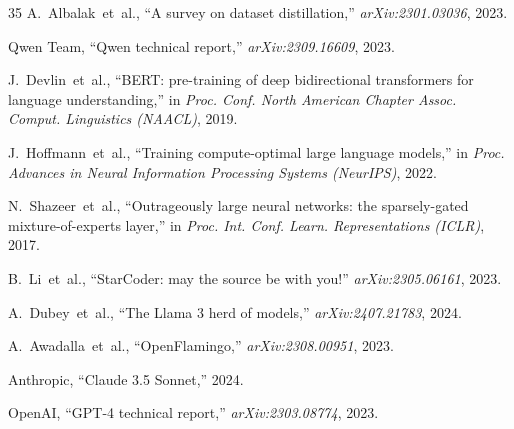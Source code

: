\documentclass[journal]{IEEEtran}
\begin{document}
\begin{thebibliography}{35}
A.~Albalak~et~al., ``A survey on dataset distillation,'' \emph{arXiv:2301.03036}, 2023.

Qwen Team, ``Qwen technical report,'' \emph{arXiv:2309.16609}, 2023.

J.~Devlin~et~al., ``BERT: pre-training of deep bidirectional transformers for language understanding,'' in \emph{Proc. Conf. North American Chapter Assoc. Comput. Linguistics (NAACL)}, 2019.

J.~Hoffmann~et~al., ``Training compute-optimal large language models,'' in \emph{Proc. Advances in Neural Information Processing Systems (NeurIPS)}, 2022.

N.~Shazeer~et~al., ``Outrageously large neural networks: the sparsely-gated mixture-of-experts layer,'' in \emph{Proc. Int. Conf. Learn. Representations (ICLR)}, 2017.

B.~Li~et~al., ``StarCoder: may the source be with you!'' \emph{arXiv:2305.06161}, 2023.

A.~Dubey~et~al., ``The Llama 3 herd of models,'' \emph{arXiv:2407.21783}, 2024.

A.~Awadalla~et~al., ``OpenFlamingo,'' \emph{arXiv:2308.00951}, 2023.

Anthropic, ``Claude 3.5 Sonnet,'' 2024.

OpenAI, ``GPT-4 technical report,'' \emph{arXiv:2303.08774}, 2023.

\end{thebibliography}
\end{document}
